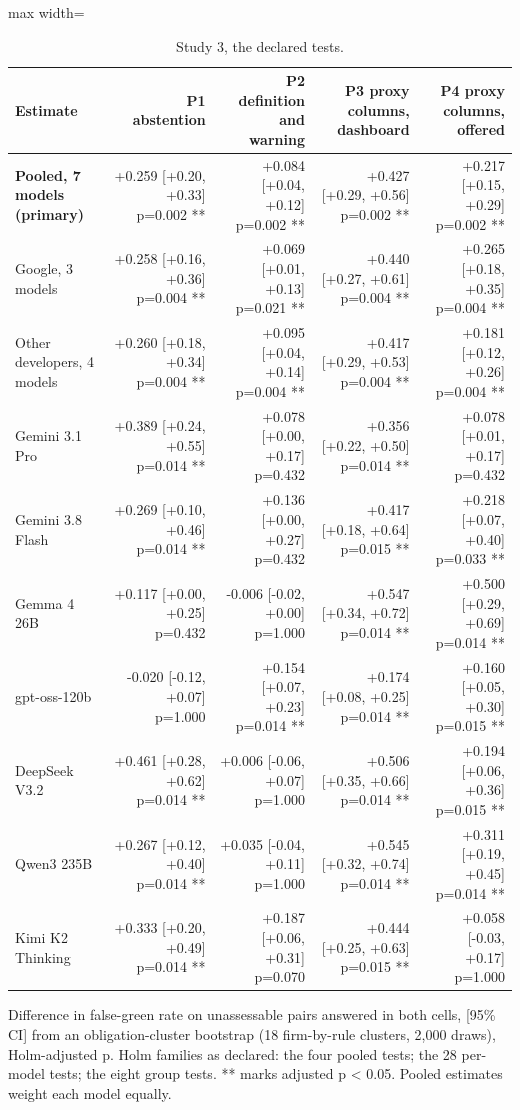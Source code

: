 \documentclass[10pt,twocolumn]{article}
\begin{document}
\begin{table}
\centering\footnotesize\setlength{\tabcolsep}{4pt}
\caption{Study 3, the declared tests.}
\label{tab:25}
\begin{adjustbox}{max width=\textheight}
\begin{tabular}{lrrrr}
\toprule
\textbf{Estimate} & \textbf{P1 abstention} & \textbf{P2 definition and warning} & \textbf{P3 proxy columns, dashboard} & \textbf{P4 proxy columns, offered} \\
\midrule
\textbf{Pooled, 7 models (primary)} & +0.259 [+0.20, +0.33] p=0.002 ** & +0.084 [+0.04, +0.12] p=0.002 ** & +0.427 [+0.29, +0.56] p=0.002 ** & +0.217 [+0.15, +0.29] p=0.002 ** \\
Google, 3 models & +0.258 [+0.16, +0.36] p=0.004 ** & +0.069 [+0.01, +0.13] p=0.021 ** & +0.440 [+0.27, +0.61] p=0.004 ** & +0.265 [+0.18, +0.35] p=0.004 ** \\
Other developers, 4 models & +0.260 [+0.18, +0.34] p=0.004 ** & +0.095 [+0.04, +0.14] p=0.004 ** & +0.417 [+0.29, +0.53] p=0.004 ** & +0.181 [+0.12, +0.26] p=0.004 ** \\
Gemini 3.1 Pro & +0.389 [+0.24, +0.55] p=0.014 ** & +0.078 [+0.00, +0.17] p=0.432 & +0.356 [+0.22, +0.50] p=0.014 ** & +0.078 [+0.01, +0.17] p=0.432 \\
Gemini 3.8 Flash & +0.269 [+0.10, +0.46] p=0.014 ** & +0.136 [+0.00, +0.27] p=0.432 & +0.417 [+0.18, +0.64] p=0.015 ** & +0.218 [+0.07, +0.40] p=0.033 ** \\
Gemma 4 26B & +0.117 [+0.00, +0.25] p=0.432 & -0.006 [-0.02, +0.00] p=1.000 & +0.547 [+0.34, +0.72] p=0.014 ** & +0.500 [+0.29, +0.69] p=0.014 ** \\
gpt-oss-120b & -0.020 [-0.12, +0.07] p=1.000 & +0.154 [+0.07, +0.23] p=0.014 ** & +0.174 [+0.08, +0.25] p=0.014 ** & +0.160 [+0.05, +0.30] p=0.015 ** \\
DeepSeek V3.2 & +0.461 [+0.28, +0.62] p=0.014 ** & +0.006 [-0.06, +0.07] p=1.000 & +0.506 [+0.35, +0.66] p=0.014 ** & +0.194 [+0.06, +0.36] p=0.015 ** \\
Qwen3 235B & +0.267 [+0.12, +0.40] p=0.014 ** & +0.035 [-0.04, +0.11] p=1.000 & +0.545 [+0.32, +0.74] p=0.014 ** & +0.311 [+0.19, +0.45] p=0.014 ** \\
Kimi K2 Thinking & +0.333 [+0.20, +0.49] p=0.014 ** & +0.187 [+0.06, +0.31] p=0.070 & +0.444 [+0.25, +0.63] p=0.015 ** & +0.058 [-0.03, +0.17] p=1.000 \\
\bottomrule
\end{tabular}
\end{adjustbox}
\par\vspace{3pt}\begin{minipage}{\textheight}\scriptsize Difference in false-green rate on unassessable pairs answered in both cells, [95\% CI] from an obligation-cluster bootstrap (18 firm-by-rule clusters, 2,000 draws), Holm-adjusted p. Holm families as declared: the four pooled tests; the 28 per-model tests; the eight group tests. ** marks adjusted p < 0.05. Pooled estimates weight each model equally.\end{minipage}
\end{table}
\end{document}
